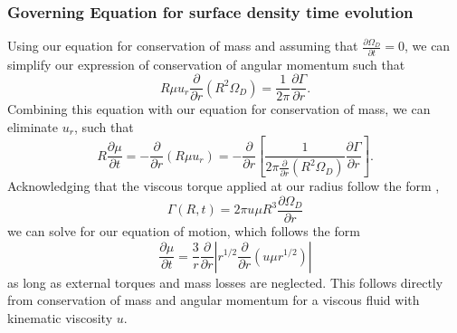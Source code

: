 \documentclass[aps,pra,twocolumn]{revtex4-1}
\begin{document}
\subsubsection{\label{section 2.1.3} Governing Equation for surface density time evolution}
Using our equation for conservation of mass and assuming that $\frac{\partial{\Omega_D}}{\partial t} = 0$, we can simplify our expression of conservation of angular momentum such that
\begin{equation}
R\mu u_r \frac{\partial}{\partial r} (R^2 \Omega_D) = \frac{1}{2\pi} \frac{\partial \Gamma}{\partial r}.
\end{equation}
Combining this equation with our equation for conservation of mass, we can eliminate $u_r$, such that
\begin{equation}
R \frac{\partial \mu}{\partial t} = -\frac{\partial}{\partial r}(R \mu u_r) = - \frac{\partial}{\partial r}\left[ \frac{1}{2\pi \frac{\partial}{\partial r}(R^2 \Omega_D)}\frac{\partial \Gamma}{\partial r} \right].
\end{equation}
Acknowledging that the viscous torque applied at our radius follow the form \cite{king2002},
\begin{equation}
\Gamma(R, t) = 2\pi  u \mu R^3 \frac{\partial \Omega_D}{\partial r} \label{torque}
\end{equation}
we can solve for our equation of motion, which follows the form 
\begin{equation}
\frac{\partial \mu}{\partial t} = \frac{3}{r} \frac{\partial}{\partial r} \left| r^{1/2}\frac{\partial}{\partial r}\left( u \mu r^{1/2} \right) \right|
\end{equation}
as long as external torques and mass losses are neglected\cite{king2002, armitage2011}.  This follows directly from conservation of mass and angular momentum for a viscous fluid with kinematic viscosity $u$.
\end{document}

